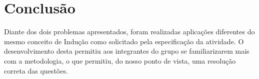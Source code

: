 \documentclass[a4paper, 10pt]{article}
\begin{document}

\section{Conclusão}

Diante dos dois problemas apresentados, foram realizadas aplicações diferentes do mesmo conceito de Indução como solicitado pela especificação da atividade. O desenvolvimento desta permitiu aos integrantes do grupo se familiarizarem mais com a metodologia, o que permitiu, do nosso ponto de vista, uma resolução correta das questões.
\end{document}

